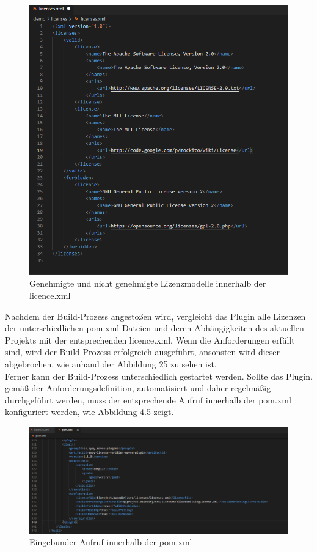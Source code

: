 \begin{figure}[h]
    \centering
    \includegraphics[scale=0.45]{Bilder/licencesxml.png}
    \caption{Genehmigte und nicht genehmigte Lizenzmodelle innerhalb der licence.xml}
\end{figure}

Nachdem der Build-Prozess angestoßen wird, vergleicht das Plugin alle Lizenzen der unterschiedlichen pom.xml-Dateien und deren Abhängigkeiten des aktuellen Projekts mit der entsprechenden licence.xml. Wenn die Anforderungen erfüllt sind, wird der Build-Prozess erfolgreich ausgeführt, ansonsten wird dieser abgebrochen, wie anhand der Abbildung 25 zu sehen ist.\\ Ferner kann der Build-Prozess unterschiedlich gestartet werden. Sollte das Plugin, gemäß der Anforderungsdefinition, automatisiert und daher regelmäßig durchgeführt werden, muss der entsprechende Aufruf innerhalb der pom.xml konfiguriert werden, wie Abbildung 4.5 zeigt. 

\begin{figure}[h]
    \centering
    \includegraphics[scale=0.45]{Bilder/PluginConfigurationzumAufruf.png}
    \caption{Eingebunder Aufruf innerhalb der pom.xml}
\end{figure}


